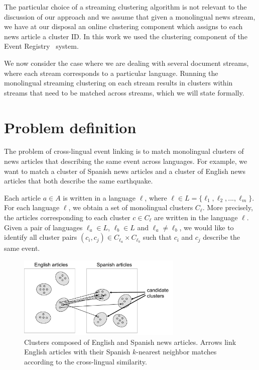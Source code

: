 The particular choice of a streaming clustering algorithm is not relevant
to the discussion of our approach and we assume that given a monolingual news stream, we have
at our disposal an online clustering component which assigns to each news
article a cluster ID. In this work we used the clustering
component of the Event Registry~\cite{Leban2014W,Leban2014I} system.

We now consider the case where we are dealing with several document streams, where each
stream corresponds to a particular language. Running the monolingual streaming clustering
on each stream results in clusters within streams that need to be matched across streams,
which we will state formally.

\section{Problem definition}

The problem of cross-lingual event linking is to match monolingual clusters of news articles 
that describing the same event across languages. For example, we want to match a cluster of 
Spanish news articles and a cluster of English news articles that both describe the same earthquake.

Each article $a \in A$ is written in a language $\ell$, where $\ell \in L = \{\ell_1,\ell_2,...,\ell_m\}$. 
For each language $\ell$, we obtain a set of monolingual clusters $C_{\ell}$. More precisely, 
the articles corresponding to each cluster $c \in C_{\ell}$ are written in the language $\ell$. 
Given a pair of languages $\ell_a \in L$, $\ell_b \in L$ and $\ell_a \not= \ell_b$, we would like 
to identify all cluster pairs $(c_i, c_j) \in C_{\ell_a} \times C_{\ell_b}$ such that $c_i$ and $c_j$ describe the same event.

\begin{figure}[tb]
\centering
\includegraphics[width=0.7\textwidth]{figures/clusters.pdf}
\caption{\label{fig:clusters} Clusters composed of English and Spanish news articles. Arrows link English articles with their Spanish $k$-nearest neighbor matches according to the cross-lingual similarity.}
\end{figure}

